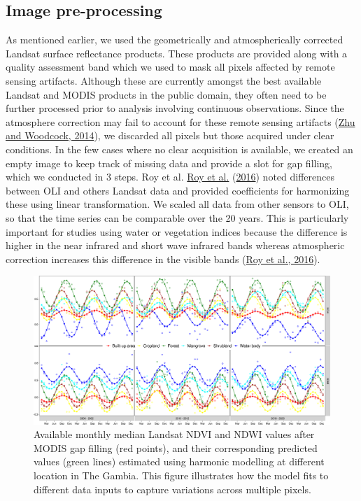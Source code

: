 \documentclass[utf8]{frontiersSCNS}
\begin{document}
\hypertarget{ref31}{%
\subsection{Image pre-processing}\label{ref31}}

As mentioned earlier, we used the geometrically and atmospherically
corrected Landsat surface reflectance products. These products are
provided along with a quality assessment band which we used to mask all
pixels affected by remote sensing artifacts. Although these are
currently amongst the best available Landsat and MODIS products in the
public domain, they often need to be further processed prior to analysis
involving continuous observations. Since the atmosphere correction may
fail to account for these remote sensing artifacts
(\protect\hyperlink{ref-Zhu-and-Woodcock-2014}{Zhu and Woodcock, 2014}),
we discarded all pixels but those acquired under clear conditions. In
the few cases where no clear acquisition is available, we created an
empty image to keep track of missing data and provide a slot for gap
filling, which we conducted in 3 steps. Roy et al.
\protect\hyperlink{ref-Roy-et-al-2016}{Roy et al.}
(\protect\hyperlink{ref-Roy-et-al-2016}{2016}) noted differences between
OLI and others Landsat data and provided coefficients for harmonizing
these using linear transformation. We scaled all data from other sensors
to OLI, so that the time series can be comparable over the 20 years.
This is particularly important for studies using water or vegetation
indices because the difference is higher in the near infrared and short
wave infrared bands whereas atmospheric correction increases this
difference in the visible bands
(\protect\hyperlink{ref-Roy-et-al-2016}{Roy et al., 2016}).

\begin{figure}
\includegraphics[width=1\linewidth]{figures/Gambia_ndsi_ts} \caption{Available monthly median Landsat NDVI and NDWI values after MODIS gap filling (red points), and their corresponding predicted values (green lines) estimated using harmonic modelling at different location in The Gambia. This figure illustrates how the model fits to different data inputs to capture variations across multiple pixels.}\label{fig:fig2}
\end{figure}
\end{document}
